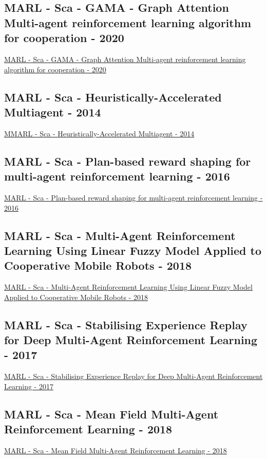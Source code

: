 \subsection{MARL - Sca - GAMA - Graph Attention Multi-agent reinforcement learning algorithm for cooperation - 2020}
\href{https://link.springer.com/article/10.1007/s10489-020-01755-8}{MARL - Sca - GAMA - Graph Attention Multi-agent reinforcement learning algorithm for cooperation - 2020}
\subsection{MARL - Sca - Heuristically-Accelerated Multiagent - 2014}
\href{https://ieeexplore.ieee.org/abstract/document/6502216}{MMARL - Sca - Heuristically-Accelerated Multiagent - 2014}



\subsection{MARL - Sca - Plan-based reward shaping for multi-agent reinforcement learning - 2016}
\href{https://www.cambridge.org/core/journals/knowledge-engineering-review/article/planbased-reward-shaping-for-multiagent-reinforcement-learning/B173D25B1006B755667616C3A3EB3BE5}{MARL - Sca - Plan-based reward shaping for multi-agent reinforcement learning - 2016}

\subsection{MARL - Sca - Multi-Agent Reinforcement Learning Using Linear Fuzzy Model Applied to Cooperative Mobile Robots - 2018}
\href{https://www.mdpi.com/2073-8994/10/10/461}{MARL - Sca - Multi-Agent Reinforcement Learning Using Linear Fuzzy Model Applied to Cooperative Mobile Robots - 2018}

\subsection{MARL - Sca - Stabilising Experience Replay for Deep Multi-Agent Reinforcement Learning - 2017}
\href{http://proceedings.mlr.press/v70/foerster17b.html}{MARL - Sca - Stabilising Experience Replay for Deep Multi-Agent Reinforcement Learning - 2017}

\subsection{MARL - Sca - Mean Field Multi-Agent Reinforcement Learning - 2018}
\href{http://proceedings.mlr.press/v80/yang18d.html}{MARL - Sca - Mean Field Multi-Agent Reinforcement Learning - 2018}

